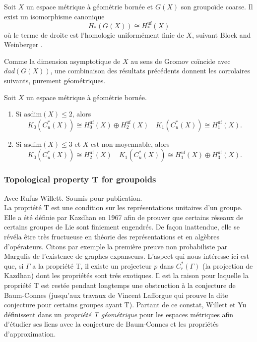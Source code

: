 \documentclass[a4paper,11pt]{article}
\begin{document}
\begin{thmx}\label{Thm:D}
	Soit $X$ un espace métrique à géométrie bornée et $G(X)$ son groupoïde coarse. Il exist un isomorphisme canonique	
    $$H_*(G(X))\cong H_*^{\mathrm{uf}}(X)$$
	où le terme de droite est l'homologie uniformément finie de $X$, suivant Block and Weinberger \cite{Block1992}.
\end{thmx}

Comme la dimension asymptotique de $X$ au sens de Gromov coïncide avec $dad(G(X))$, une combinaison des résultats précédents donnent les corrolaires suivants, purement géométriques. 

\begin{corx}
	Soit $X$ un espace métrique à géométrie bornée. 
	\begin{enumerate}
		\item Si $\mathrm{asdim}(X)\leq 2$, alors
		$$K_0(C_u^*(X))\cong H_0^{\mathrm{uf}}(X)\oplus H_2^{\mathrm{uf}}(X)\quad K_1(C_u^*(X))\cong H_1^{\mathrm{uf}}(X).$$
		\item Si $\mathrm{asdim}(X)\leq 3$ et $X$ est non-moyennable, alors
		$$K_0(C_u^*(X))\cong H_2^{\mathrm{uf}}(X)\quad K_1(C_u^*(X))\cong H_1^{\mathrm{uf}}(X)\oplus H_3^{\mathrm{uf}}(X).$$
	\end{enumerate}
\end{corx}


\subsubsection*{Topological property T for groupoids} 
Avec Rufus Willett. Soumis pour publication.\\

La propri\'et\'e T est une condition sur les repr\'esentations unitaires d'un groupe. Elle a \'et\'e d\'efinie par Kazdhan \cite{kazhdan1967connection} en 1967 afin de prouver que certains r\'eseaux de certains groupes de Lie sont finiement engendr\'es. De fa\c{c}on inattendue, elle se r\'ev\'ela \^etre tr\`es fructueuse en th\'eorie des repr\'esentations et en alg\`ebres d'op\'erateurs. Citons par exemple la premi\`ere preuve non probabiliste par Margulis de l'existence de graphes expanseurs. L'aspect qui nous int\'eresse ici est que, si $\Gamma$ a la propri\'et\'e T, il existe un projecteur $p$ dans $C^*_r(\Gamma)$ (la projection de Kazdhan) dont les propri\'et\'es sont tr\'es exotiques. Il est la raison pour laquelle la propri\'et\'e T est rest\'ee pendant longtemps une obstruction \`a la conjecture de Baum-Connes (jusqu'aux travaux de Vincent Lafforgue \cite{lafforgue2002k} qui prouve la dite conjecture pour certains groupes ayant T). Partant de ce constat, Willett et Yu d\'efinissent dans \cite{WillettYu} un \textit{propri\'et\'e T g\'eom\'etrique} pour les espaces m\'etriques afin d'\'etudier ses liens avec la conjecture de Baum-Connes et les propri\'et\'es d'approximation.\\
\end{document}
